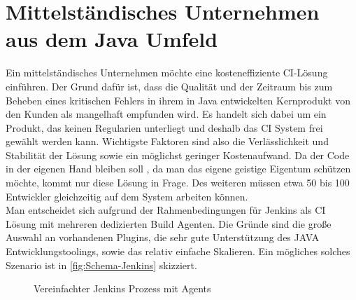 \section{Mittelständisches Unternehmen aus dem Java Umfeld}
Ein mittelständisches Unternehmen möchte eine kosteneffiziente CI-Lösung einführen. Der Grund dafür ist, dass die Qualität und der Zeitraum bis zum Beheben eines kritischen Fehlers in ihrem in Java entwickelten Kernprodukt von den Kunden als mangelhaft empfunden wird. Es handelt sich dabei um ein Produkt, das keinen Regularien unterliegt und deshalb das CI System frei gewählt werden kann. Wichtigste Faktoren sind also die Verlässlichkeit und Stabilität der Lösung sowie ein möglichst geringer Kostenaufwand. Da der Code in der eigenen Hand bleiben soll , da man das eigene geistige Eigentum schützen möchte, kommt nur diese Lösung in Frage. Des weiteren müssen etwa 50 bis 100 Entwickler gleichzeitig auf dem System arbeiten können.\\
Man entscheidet sich aufgrund der Rahmenbedingungen für Jenkins als CI Lösung mit mehreren dedizierten Build Agenten. Die Gründe sind die große Auswahl an vorhandenen Plugins, die sehr gute Unterstützung des JAVA Entwicklungstoolings, sowie das relativ einfache Skalieren. Ein mögliches solches Szenario ist in \autoref{fig:Schema-Jenkins} skizziert.
\begin{figure}[H]
  \centering
  \caption{Vereinfachter Jenkins Prozess mit Agents}\label{fig:Schema-Jenkins}
\end{figure}
